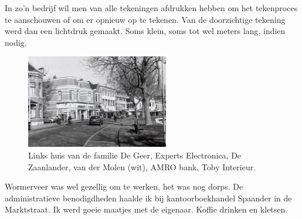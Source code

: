 \documentclass[10pt,twoside, openright]{memoir}
\begin{document}
In zo'n bedrijf wil men van alle tekeningen afdrukken hebben om het tekenproces te aanschouwen of om er opnieuw op te tekenen. Van de doorzichtige tekening werd dan een lichtdruk gemaakt. Soms klein, soms tot wel meters lang, indien nodig. 

\begin{figure}
\includegraphics[width=\textwidth]{img/ch40/21}
\caption*{\footnotesize Links huis van de familie De Geer, Experts Electronica, De Zaanlander, van der Molen (wit), AMRO bank, Toby Interieur.}
\end{figure}

Wormerveer was wel gezellig om te werken, het was nog dorps. De administratieve benodigdheden haalde ik bij kantoorboekhandel Spaander in de Marktstraat. Ik werd goeie maatjes met de eigenaar. Koffie drinken en kletsen. 
\end{document}
